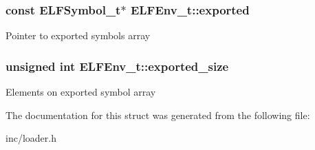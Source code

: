 \subsubsection[{\texorpdfstring{exported}{exported}}]{\setlength{\rightskip}{0pt plus 5cm}const {\bf E\+L\+F\+Symbol\+\_\+t}$\ast$ E\+L\+F\+Env\+\_\+t\+::exported}\hypertarget{structELFEnv__t_a8a0bd1705af8b4e31858d52954ded834}{}\label{structELFEnv__t_a8a0bd1705af8b4e31858d52954ded834}
Pointer to exported symbols array 
\subsubsection[{\texorpdfstring{exported\+\_\+size}{exported_size}}]{\setlength{\rightskip}{0pt plus 5cm}unsigned int E\+L\+F\+Env\+\_\+t\+::exported\+\_\+size}\hypertarget{structELFEnv__t_a156be6304952c883292044f482a23d8c}{}\label{structELFEnv__t_a156be6304952c883292044f482a23d8c}
Elements on exported symbol array 

The documentation for this struct was generated from the following file\+:\begin{DoxyCompactItemize}
\item 
inc/loader.\+h\end{DoxyCompactItemize}
